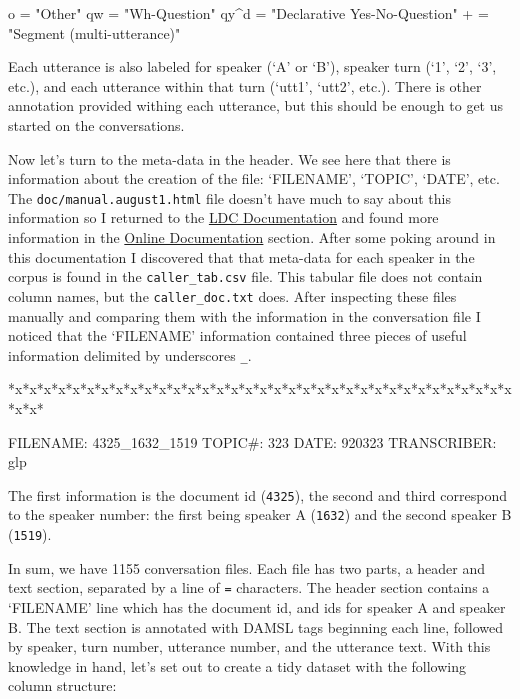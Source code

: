 \documentclass[
  letterpaper,
]{latex/krantz}
\newenvironment{Shaded}{\begin{snugshade}}{\end{snugshade}}
\newcommand{\NormalTok}[1]{\textcolor[rgb]{0.00,0.23,0.31}{#1}}
\begin{document}
\begin{Shaded}
\begin{Highlighting}[]
\NormalTok{o = "Other"}
\NormalTok{qw = "Wh{-}Question"}
\NormalTok{qy\^{}d = "Declarative Yes{-}No{-}Question"}
\NormalTok{+ = "Segment (multi{-}utterance)"}
\end{Highlighting}
\end{Shaded}

Each utterance is also labeled for speaker (`A' or `B'), speaker turn
(`1', `2', `3', etc.), and each utterance within that turn (`utt1',
`utt2', etc.). There is other annotation provided withing each
utterance, but this should be enough to get us started on the
conversations.

Now let's turn to the meta-data in the header. We see here that there is
information about the creation of the file: `FILENAME', `TOPIC', `DATE',
etc. The \texttt{doc/manual.august1.html} file doesn't have much to say
about this information so I returned to the
\href{https://catalog.ldc.upenn.edu/docs/LDC97S62/}{LDC Documentation}
and found more information in the
\href{https://catalog.ldc.upenn.edu/docs/LDC97S62/}{Online
Documentation} section. After some poking around in this documentation I
discovered that that meta-data for each speaker in the corpus is found
in the \texttt{caller\_tab.csv} file. This tabular file does not contain
column names, but the \texttt{caller\_doc.txt} does. After inspecting
these files manually and comparing them with the information in the
conversation file I noticed that the `FILENAME' information contained
three pieces of useful information delimited by underscores \texttt{\_}.

\begin{Shaded}
\begin{Highlighting}[]
\NormalTok{*x*x*x*x*x*x*x*x*x*x*x*x*x*x*x*x*x*x*x*x*x*x*x*x*x*x*x*x*x*x*x*x*x*x*x*x*x*}


\NormalTok{FILENAME:   4325\_1632\_1519}
\NormalTok{TOPIC\#:     323}
\NormalTok{DATE:       920323}
\NormalTok{TRANSCRIBER:    glp}
\end{Highlighting}
\end{Shaded}

The first information is the document id (\texttt{4325}), the second and
third correspond to the speaker number: the first being speaker A
(\texttt{1632}) and the second speaker B (\texttt{1519}).

In sum, we have 1155 conversation files. Each file has two parts, a
header and text section, separated by a line of \texttt{=} characters.
The header section contains a `FILENAME' line which has the document id,
and ids for speaker A and speaker B. The text section is annotated with
DAMSL tags beginning each line, followed by speaker, turn number,
utterance number, and the utterance text. With this knowledge in hand,
let's set out to create a tidy dataset with the following column
structure:
\end{document}
